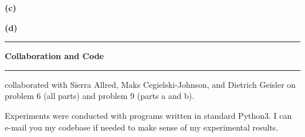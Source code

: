 \documentclass[11pt]{article}
\newcommand\question[2]{\vspace{.25in}\hrule\textbf{#1}\vspace{.5em}\hrule\vspace{.10in}}
\renewcommand\part[1]{\vspace{.10in}\textbf{(#1)}}
\begin{document}

\part{c}  


\part{d} 


\newpage

\question{Collaboration and Code}

I collaborated with Sierra Allred, Maks Cegielski-Johnson, and Dietrich Geisler on problem 6 (all parts) and problem 9 (parts a and b). \newline


Experiments were conducted with programs written in standard Python3. I can e-mail you my codebase if needed to make sense of my experimental results.
\end{document}
